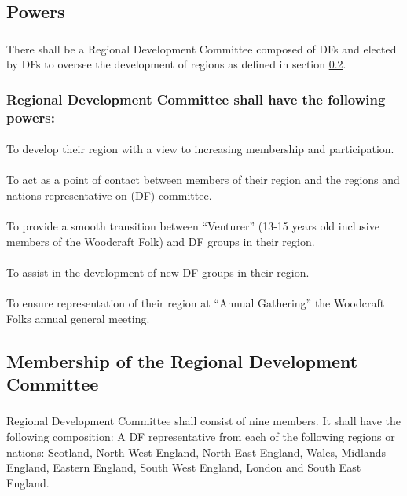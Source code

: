 \documentclass[a4paper, 12pt]{article}
\begin{document}
\subsection{Powers}
\subsubsection{}
There shall be a Regional Development Committee composed of DFs and elected by DFs to oversee the development of regions as defined in section \ref{sec:rdcmembership}.
\subsubsection{Regional Development Committee shall have the following powers:}
\paragraph{}
To develop their region with a view to increasing membership and participation.
\paragraph{}
To act as a point of contact between members of their region and the regions and nations representative on (DF) committee.
\paragraph{}
To provide a smooth transition between ``Venturer'' (13-15 years old inclusive members of the Woodcraft Folk) and DF groups in their region.
\paragraph{}
To assist in the development of new DF groups in their region.
\paragraph{}
To ensure representation of their region at ``Annual Gathering'' the Woodcraft Folks annual general meeting.

\subsection{Membership of the Regional Development Committee}
\label{sec:rdcmembership}
\subsubsection{}
Regional Development Committee shall consist of nine members. It shall have the following composition: A DF representative from each of the following regions or nations: Scotland, North West England, North East England, Wales, Midlands England, Eastern England, South West England, London and South East England.
\end{document}
